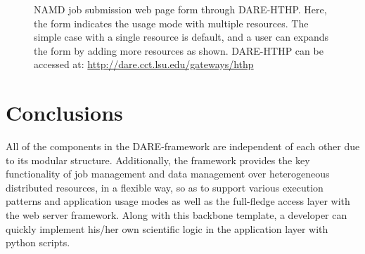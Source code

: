 \documentclass{sig-alternate}
\begin{document}
\begin{figure}
 \centering
\caption{\small NAMD job submission web page form through
  DARE-HTHP. Here, the form indicates the usage mode with multiple
  resources.  The simple case with a single resource is default, and a
  user can expands the form by adding more resources as shown.
  DARE-HTHP can be accessed at:
  \url{http://dare.cct.lsu.edu/gateways/hthp} }
  \label{fig:NAMD2}
\end{figure}


\section{Conclusions}

All of the components in the DARE-framework are independent of each
other due to its modular structure.  Additionally, the framework
provides the key functionality of job management and data management
over heterogeneous distributed resources, in a flexible way, so as to
support various execution patterns and application usage modes as well
as the full-fledge access layer with the web server framework.  Along
with this backbone template, a developer can quickly implement his/her
own scientific logic in the application layer with python scripts.
\end{document}
